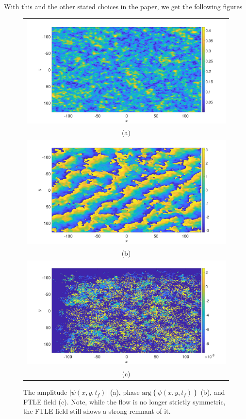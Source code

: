 \documentclass[a4paper,11pt]{article}
\begin{document}
With this and the other stated choices in the paper, we get the following figures 
\begin{figure}
\centering
\begin{tabular}{c}
\includegraphics[width=.95\textwidth]{amplitude_K_128_Lx_128_tf_1pt5e4} \\
(a) \\
\includegraphics[width=.95\textwidth]{phase_K_128_Lx_128_tf_1pt5e4} \\
 (b) \\
\includegraphics[width=.95\textwidth]{ftle_K_128_Lx_128_tf_1pt5e4} \\
(c)
\end{tabular}
\caption{The amplitude $\left|\psi(x,y,t_{f})\right|$ (a), phase $\mbox{arg}\left\{\psi(x,y,t_{f})\right\}$ (b), and FTLE field (c).  Note, while the flow is no longer strictly symmetric, the FTLE field still shows a strong remnant of it.}
\end{figure}
\end{document}
